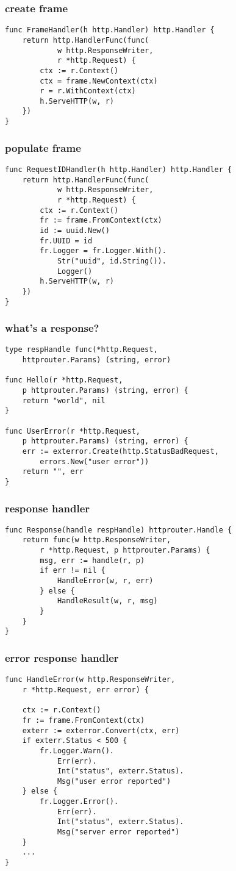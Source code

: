 \documentclass{beamer}
\begin{document}
\begin{frame}[fragile]
\frametitle{create frame}
\begin{lstlisting}[basicstyle=\ttfamily\footnotesize]
func FrameHandler(h http.Handler) http.Handler {
	return http.HandlerFunc(func(
			w http.ResponseWriter,
			r *http.Request) {
		ctx := r.Context()
		ctx = frame.NewContext(ctx)
		r = r.WithContext(ctx)
		h.ServeHTTP(w, r)
	})
}
\end{lstlisting}
\end{frame}

\begin{frame}[fragile]
\frametitle{populate frame}
\begin{lstlisting}[basicstyle=\ttfamily\footnotesize]
func RequestIDHandler(h http.Handler) http.Handler {
	return http.HandlerFunc(func(
			w http.ResponseWriter,
			r *http.Request) {
		ctx := r.Context()
		fr := frame.FromContext(ctx)
		id := uuid.New()
		fr.UUID = id
		fr.Logger = fr.Logger.With().
			Str("uuid", id.String()).
			Logger()
		h.ServeHTTP(w, r)
	})
}
\end{lstlisting}
\end{frame}

\begin{frame}[fragile]
\frametitle{what's a response?}
\begin{lstlisting}[basicstyle=\ttfamily\footnotesize]
type respHandle func(*http.Request,
	httprouter.Params) (string, error)

func Hello(r *http.Request,
	p httprouter.Params) (string, error) {
	return "world", nil
}

func UserError(r *http.Request,
	p httprouter.Params) (string, error) {
	err := exterror.Create(http.StatusBadRequest,
		errors.New("user error"))
	return "", err
}
\end{lstlisting}
\end{frame}	

\begin{frame}[fragile]
\frametitle{response handler}
\begin{lstlisting}[basicstyle=\ttfamily\footnotesize]
func Response(handle respHandle) httprouter.Handle {
	return func(w http.ResponseWriter,
		r *http.Request, p httprouter.Params) {
		msg, err := handle(r, p)
		if err != nil {
			HandleError(w, r, err)
		} else {
			HandleResult(w, r, msg)
		}
	}
}
\end{lstlisting}
\end{frame}

\begin{frame}[fragile]
\frametitle{error response handler}
\begin{lstlisting}[basicstyle=\ttfamily\footnotesize]
func HandleError(w http.ResponseWriter,
	r *http.Request, err error) {

	ctx := r.Context()
	fr := frame.FromContext(ctx)
	exterr := exterror.Convert(ctx, err)
	if exterr.Status < 500 {
		fr.Logger.Warn().
			Err(err).
			Int("status", exterr.Status).
			Msg("user error reported")
	} else {
		fr.Logger.Error().
			Err(err).
			Int("status", exterr.Status).
			Msg("server error reported")
	}
	...
}
\end{lstlisting}
\end{frame}
\end{document}
